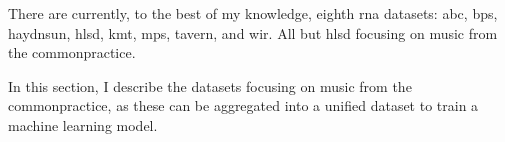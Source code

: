 
There are currently, to the best of my knowledge, eighth
\gls{rna} datasets: \gls{abc}, \gls{bps}, \gls{haydnsun},
\gls{hlsd}, \gls{kmt}, \gls{mps}, \gls{tavern}, and
\gls{wir}. All but \gls{hlsd} focusing on music from the
\gls{commonpractice}.

In this section, I describe the datasets focusing on music
from the \gls{commonpractice}, as these can be aggregated
into a unified dataset to train a machine learning model.
